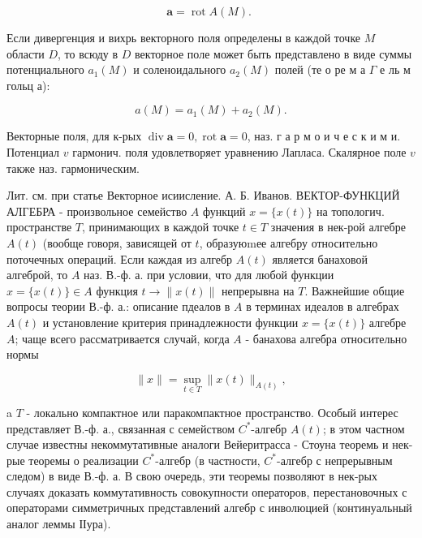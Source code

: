 \documentclass[10pt]{article}
\begin{document}
\[

\boldsymbol{a}=\operatorname{rot} A(M) \text {. }

\]



Если дивергенция и вихрь векторного поля определены в каждой точке $M$ области $D$, то всюду в $D$ векторное поле может быть представлено в виде суммы потенциального $a_{1}(M)$ и соленоидального $a_{2}(M)$ полей (те о ре м а $\Gamma$ е ль м гольц а):



\[

a(M)=a_{1}(M)+a_{2}(M) .

\]



Векторные поля, для к-рых $\operatorname{div} \boldsymbol{a}=0, \operatorname{rot} \boldsymbol{a}=0$, наз. г а р м о и ч е с к и м и. Потенциал $v$ гармонич. поля удовлетворяет уравнению Лапласа. Скалярное поле $v$ также наз. гармоническим.



Лит. см. при статье Векторное исиисление. А. Б. Иванов. ВЕКТОР-ФУНКЦИЙ АЛГЕБРА - произвольное семейство $A$ функций $x=\{x(t)\}$ на топологич. пространстве $T$, принимающих в каждой точке $t \in T$ значения в нек-рой алгебре $A(t)$ (вообще говоря, зависящей от $t$, образуюmее алгебру относительно поточечных операций. Если каждая из алгебр $A(t)$ является банаховой алгеброй, то $A$ наз. В.-ф. а. при условии, что для любой функции $x=\{x(t)\} \in A$ функция $t \rightarrow\|x(t)\|$ непрерывна на $T$. Важнейшие общие вопросы теории В.-ф. а.: описание пдеалов в $A$ в терминах идеалов в алгебрах $A(t)$ и установление критерия принадлежности функции $x=\{x(t)\}$ алгебре $A$; чаще всего рассматривается случай, когда $A$ - банахова алгебра относительно нормы



\[

\|x\|=\sup _{t \in T}\|x(t)\|_{A(t)},

\]



a $T$ - локально компактное или паракомпактное пространство. Особый интерес представляет В.-ф. а., связанная с семейством $C^{*}$-алгебр $A(t)$; в этом частном случае известны некоммутативные аналоги Вейеритрасса - Стоуна теоремь и нек-рые теоремы о реализации $C^{*}$-алгебр (в частности, $C^{*}$-алгебр с непрерывным следом) в виде В.-ф. а. В свою очередь, эти теоремы позволяют в нек-рых случаях доказать коммутативность совокупности операторов, перестановочных с операторами симметричных представлений алгебр с инволюцией (континуальный аналог леммы ІІура).
\end{document}
